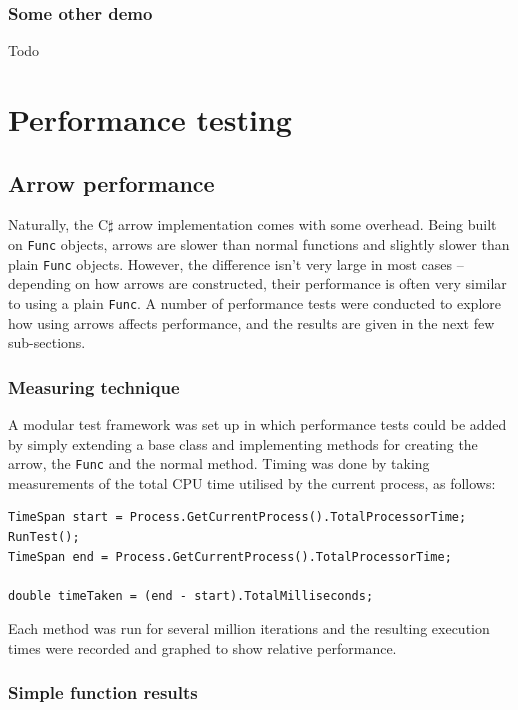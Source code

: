 \documentclass[12pt,twoside,notitlepage]{report}
\begin{document}
\subsubsection{Some other demo}

Todo

\section{Performance testing}

\subsection{Arrow performance}

Naturally, the C$\sharp$ arrow implementation comes with some overhead. Being built on \texttt{Func} objects, arrows are slower than normal functions and slightly slower than plain \texttt{Func} objects. However, the difference isn't very large in most cases -- depending on how arrows are constructed, their performance is often very similar to using a plain \texttt{Func}. A number of performance tests were conducted to explore how using arrows affects performance, and the results are given in the next few sub-sections.

\subsubsection{Measuring technique}

A modular test framework was set up in which performance tests could be added by simply extending a base class and implementing methods for creating the arrow, the \texttt{Func} and the normal method. Timing was done by taking measurements of the total CPU time utilised by the current process, as follows:

\begin{lstlisting}[language={[sharp]C}]
TimeSpan start = Process.GetCurrentProcess().TotalProcessorTime;
RunTest();
TimeSpan end = Process.GetCurrentProcess().TotalProcessorTime;

double timeTaken = (end - start).TotalMilliseconds;
\end{lstlisting}

Each method was run for several million iterations and the resulting execution times were recorded and graphed to show relative performance.

\subsubsection{Simple function results}
\end{document}
